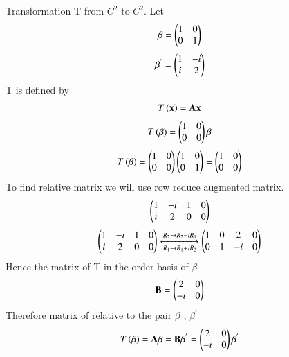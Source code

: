 Transformation T from $C^{2}$ to $C^{2}$. Let
\begin{align}
    \beta = \begin{pmatrix}1&0\\0&1\end{pmatrix}
\end{align}
\begin{align}
 \beta^{'}= \begin{pmatrix}1&-i\\i&2\end{pmatrix}
\end{align}
T is defined by
\begin{align}
   T\left(\mathbf{x}\right) = \mathbf{A}\mathbf{x}
 \end{align}
 \begin{align}
    T\left(\beta\right)=\begin{pmatrix}1&0\\0&0\end{pmatrix}{\beta}
\end{align}
\begin{align}
    T\left(\beta\right)=\begin{pmatrix}1&0\\0&0\end{pmatrix}\begin{pmatrix}1&0\\0&1\end{pmatrix}
    =\begin{pmatrix}1&0\\0&0\end{pmatrix}
\end{align}
To find relative matrix we will use row reduce augmented matrix.
\begin{align}
    \begin{pmatrix}1&-i&1&0\\i&2&0&0\end{pmatrix}
\end{align}
\begin{align}
\begin{pmatrix}1&-i&1&0\\i&2&0&0\end{pmatrix}
\xleftrightarrow[R_1\rightarrow R_1+iR_2]{R_2\rightarrow R_2-iR_1}
\begin{pmatrix}1&0&2&0\\0&1&-i&0\end{pmatrix}
\end{align}
Hence the matrix of T in the order basis of $\beta^{'}$
\begin{align}
    \mathbf{B}=\begin{pmatrix}2&0\\-i&0\end{pmatrix}
\end{align}
 Therefore matrix of relative to the pair $\beta$ , $\beta^{'}$  
 \begin{align}
  T\left(\mathbf{\beta}\right)=\mathbf{A}\beta = \mathbf{B}\beta^{'}=\begin{pmatrix}2&0\\-i&0\end{pmatrix}\mathbf{\beta^{'}}   
 \end{align}

